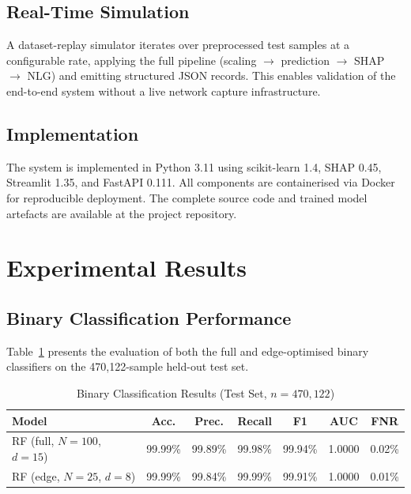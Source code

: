 \documentclass[12pt,a4paper]{article}
\begin{document}
\subsection{Real-Time Simulation}

A dataset-replay simulator iterates over preprocessed test samples at a
configurable rate, applying the full pipeline (scaling $\rightarrow$ prediction
$\rightarrow$ SHAP $\rightarrow$ NLG) and emitting structured JSON records.
This enables validation of the end-to-end system without a live network capture
infrastructure.

\subsection{Implementation}

The system is implemented in Python 3.11 using scikit-learn 1.4, SHAP 0.45,
Streamlit 1.35, and FastAPI 0.111. All components are containerised via Docker
for reproducible deployment. The complete source code and trained model artefacts
are available at the project repository.

\section{Experimental Results}
\label{sec:results}

\subsection{Binary Classification Performance}

Table~\ref{tab:binary_results} presents the evaluation of both the full and
edge-optimised binary classifiers on the 470,122-sample held-out test set.

\begin{table}[h!]
\centering
\caption{Binary Classification Results (Test Set, $n=470{,}122$)}
\label{tab:binary_results}
\begin{tabular}{lcccccc}
\toprule
\textbf{Model} & \textbf{Acc.} & \textbf{Prec.} & \textbf{Recall} & \textbf{F1} & \textbf{AUC} & \textbf{FNR} \\
\midrule
RF (full, $N=100$, $d=15$) & 99.99\% & 99.89\% & 99.98\% & 99.94\% & 1.0000 & 0.02\% \\
RF (edge, $N=25$, $d=8$)   & 99.99\% & 99.84\% & 99.99\% & 99.91\% & 1.0000 & 0.01\% \\
\bottomrule
\end{tabular}
\end{table}
\end{document}
